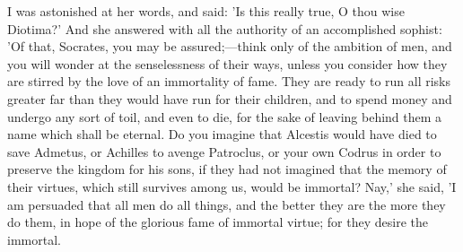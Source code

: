 \documentclass[11pt,letter]{article}
\begin{document}
\par  I was astonished at her words, and said: 'Is this really true, O thou wise Diotima?' And she answered with all the authority of an accomplished sophist: 'Of that, Socrates, you may be assured;—think only of the ambition of men, and you will wonder at the senselessness of their ways, unless you consider how they are stirred by the love of an immortality of fame. They are ready to run all risks greater far than they would have run for their children, and to spend money and undergo any sort of toil, and even to die, for the sake of leaving behind them a name which shall be eternal. Do you imagine that Alcestis would have died to save Admetus, or Achilles to avenge Patroclus, or your own Codrus in order to preserve the kingdom for his sons, if they had not imagined that the memory of their virtues, which still survives among us, would be immortal? Nay,' she said, 'I am persuaded that all men do all things, and the better they are the more they do them, in hope of the glorious fame of immortal virtue; for they desire the immortal.
\end{document}
